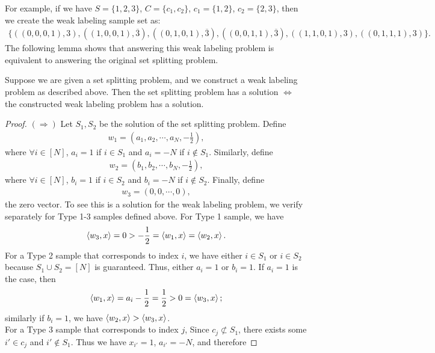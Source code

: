 For example, if we have $S=\{1,2,3\}$, $C=\{c_1, c_2\}$, $c_1 = \{1,2\}$, $c_2=\{2,3\}$, then we create the weak labeling sample set as:
\begin{align*}
    \{((0,0,0,1),3), ((1,0,0,1),\overline{3}), ((0,1,0,1),\overline{3}), ((0,0,1,1),\overline{3}), ((1,1,0,1),3), ((0,1,1,1),3)\}.
\end{align*}
The following lemma shows that answering this weak labeling problem is equivalent to answering the original set splitting problem.
\begin{lemma}
Suppose we are given a set splitting problem, and we construct a weak labeling problem as described above. Then the set splitting problem has a solution $\Longleftrightarrow$ the constructed weak labeling problem has a solution.
\end{lemma}
\begin{proof}
 $(\Longrightarrow)$ Let $S_1, S_2$ be the solution of the set splitting problem. Define
 \begin{align*}
     w_1 = \left(a_1, a_2, \cdots, a_N, -\frac{1}{2}\right),
 \end{align*}
 where $\forall i\in[N]$, $a_i=1$ if $i\in S_1$ and $a_i=-N$ if $i\notin S_1$.
 Similarly, define
 \begin{align*}
     w_2 = \left(b_1, b_2, \cdots, b_N, -\frac{1}{2}\right),
 \end{align*}
 where $\forall i\in[N]$, $b_i=1$ if $i\in S_2$ and $b_i=-N$ if $i\notin S_2$.
 Finally, define
 \begin{align*}
     w_3 = (0,0,\cdots, 0),
 \end{align*}
 the zero vector. To see this is a solution for the weak labeling problem, we verify separately for Type 1-3 samples defined above. For Type 1 sample, we have
 \begin{align*}
     \left\langle w_3, x \right\rangle = 0 > -\frac{1}{2} = \left\langle w_1, x \right\rangle=\left\langle w_2, x \right\rangle.
 \end{align*}
 For a Type 2 sample that corresponds to index $i$, we have either $i\in S_1$ or $i\in S_2$ because $S_1\cup S_2 = [N]$ is guaranteed. Thus, either $a_i=1$ or $b_i=1$. If $a_i=1$ is the case, then
 \begin{align*}
     \left\langle w_1, x \right\rangle=a_i-\frac{1}{2}=\frac{1}{2} > 0 = \left\langle w_3, x \right\rangle;
 \end{align*}
 similarly if $b_i=1$, we have $\left\langle w_2, x \right\rangle>\left\langle w_3, x \right\rangle$. \\
 For a Type 3 sample that corresponds to index $j$, Since $c_j \not\subset S_1$, there exists some $i'\in c_j$ and $i'\notin S_1$. Thus we have $x_{i'}=1$, $a_{i'}=-N$, and therefore

\end{proof}
